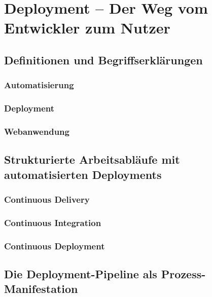 \chapter{Deployment – Der Weg vom Entwickler zum Nutzer}


\section{Definitionen und Begriffserklärungen}

\subsection{Automatisierung}


\subsection{Deployment}


\subsection{Webanwendung}


\section{Strukturierte Arbeitsabläufe mit automatisierten Deployments}


\subsection{Continuous Delivery}


\subsection{Continuous Integration}


\subsection{Continuous Deployment}


\section{Die Deployment-Pipeline als Prozess-Manifestation}
